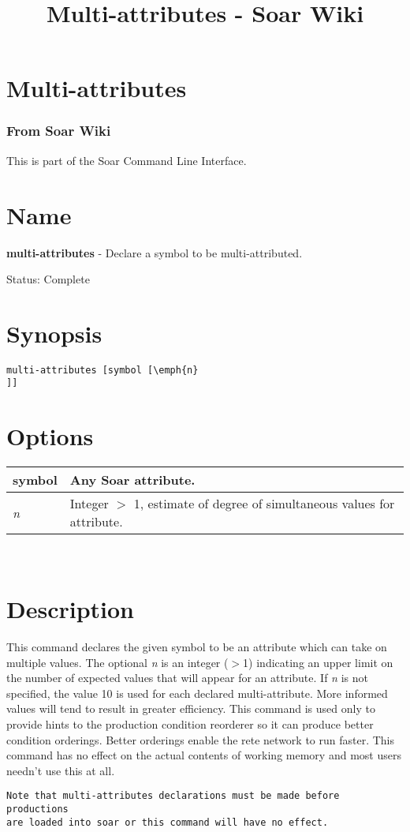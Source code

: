 \documentclass[10pt]{article}
\title{Multi-attributes - Soar Wiki}
\begin{document}
\section*{Multi-attributes}
\subsubsection*{From Soar Wiki}


 This is part of the Soar Command Line Interface. 
\section*{ Name }


 \textbf{multi-attributes}
 - Declare a symbol to be multi-attributed. 


 Status: Complete
\section*{ Synopsis }
\begin{verbatim}
multi-attributes [symbol [\emph{n}
]] 

\end{verbatim}
\section*{ Options }


\begin{tabular}{|p{1in}|p{5in}|}
\hline 
symbol & Any Soar attribute.  \\
 \hline 
\emph{n}
 & Integer $>$ 1, estimate of degree of simultaneous values for attribute.  \\
 \hline 

\end{tabular}



 \\ 

\section*{ Description }


 This command declares the given symbol to be an attribute which can take on multiple values. The optional \emph{n}
 is an integer ($>$1) indicating an upper limit on the number of expected values that will appear for an attribute. If \emph{n}
 is not specified, the value 10 is used for each declared multi-attribute. More informed values will tend to result in greater efficiency. This command is used only to provide hints to the production condition reorderer so it can produce better condition orderings. Better orderings enable the rete network to run faster. This command has no effect on the actual contents of working memory and most users needn't use this at all. \begin{verbatim}
Note that multi-attributes declarations must be made before productions 
are loaded into soar or this command will have no effect.

\end{verbatim}
\end{document}
